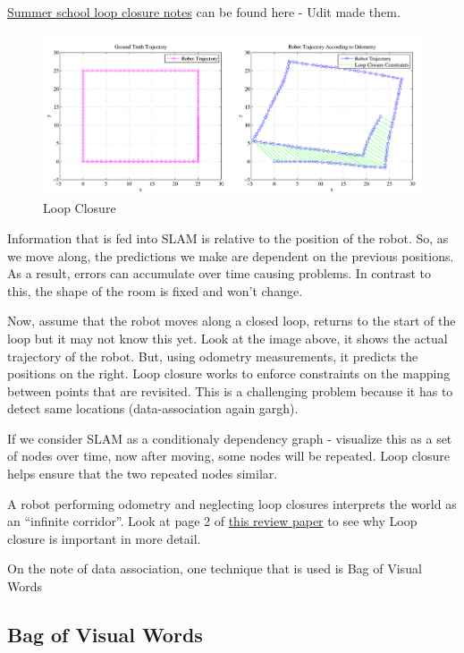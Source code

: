 \href{https://www.notion.so/Loop-Closure-8ab30a4560ea4d859c92c515c99ef70a}{Summer school loop closure notes} can be found here - Udit made them.

\begin{figure}[h]
    \centering
    \includegraphics[width=12cm ]{img/loop_closure.png}
    \caption{Loop Closure}
    \label{fig:loop_closure}
\end{figure}

Information that is fed into SLAM is relative to the position of the robot. So, as we move along, the predictions we make are dependent on the previous positions. As a result, errors can accumulate over time causing problems. In contrast to this, the shape of the room is fixed and won't change. 

Now, assume that the robot moves along a closed loop, returns to the start of the loop but it may not know this yet.  Look at the image above, it shows the actual trajectory of the robot. But, using odometry measurements, it predicts the positions on the right. Loop closure works to enforce constraints on the mapping between points that are revisited. This is a challenging problem because it has to detect same locations (data-association again gargh).

If we consider SLAM as a conditionaly dependency graph - visualize this as a set of nodes over time, now after moving, some nodes will be repeated. Loop closure helps ensure that the two repeated nodes similar.

A  robot  performing  odometry  and  neglecting  loop closures interprets the world as an “infinite corridor”. Look at page 2 of \href{https://arxiv.org/pdf/1606.05830.pdf#page=3&zoom=110,106,607}{this review paper} to see why Loop closure is important in more detail.

On the note of data association, one technique that is used is Bag of Visual Words

\subsection{Bag of Visual Words}

